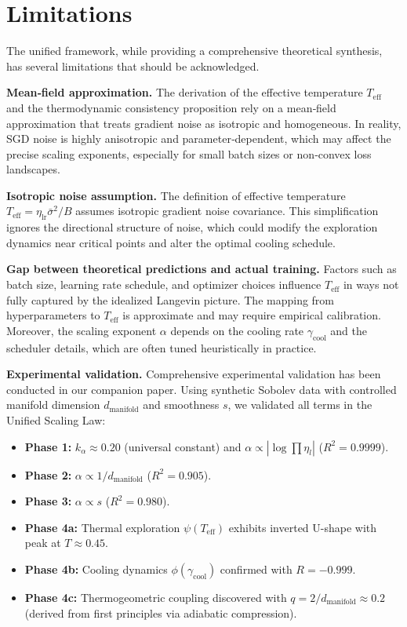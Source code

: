 \documentclass[11pt, a4paper]{article}
\theoremstyle{plain}
\begin{document}
\section{Limitations}
\label{sec:limitations}

The unified framework, while providing a comprehensive theoretical synthesis, has several limitations that should be acknowledged.

\textbf{Mean‑field approximation.} The derivation of the effective temperature $T_{\text{eff}}$ and the thermodynamic consistency proposition rely on a mean‑field approximation that treats gradient noise as isotropic and homogeneous. In reality, SGD noise is highly anisotropic and parameter‑dependent, which may affect the precise scaling exponents, especially for small batch sizes or non‑convex loss landscapes.

\textbf{Isotropic noise assumption.} The definition of effective temperature $T_{\text{eff}} = \eta_{\text{lr}}\bar{\sigma}^2/B$ assumes isotropic gradient noise covariance. This simplification ignores the directional structure of noise, which could modify the exploration dynamics near critical points and alter the optimal cooling schedule.

\textbf{Gap between theoretical predictions and actual training.} Factors such as batch size, learning rate schedule, and optimizer choices influence $T_{\text{eff}}$ in ways not fully captured by the idealized Langevin picture. The mapping from hyperparameters to $T_{\text{eff}}$ is approximate and may require empirical calibration. Moreover, the scaling exponent $\alpha$ depends on the cooling rate $\gamma_{\text{cool}}$ and the scheduler details, which are often tuned heuristically in practice.

\textbf{Experimental validation.} Comprehensive experimental validation has been conducted in our companion paper. Using synthetic Sobolev data with controlled manifold dimension $d_{\text{manifold}}$ and smoothness $s$, we validated all terms in the Unified Scaling Law:

\begin{itemize}
    \item \textbf{Phase 1:} $k_\alpha \approx 0.20$ (universal constant) and $\alpha \propto |\log\prod\eta_l|$ ($R^2 = 0.9999$).
    \item \textbf{Phase 2:} $\alpha \propto 1/d_{\text{manifold}}$ ($R^2 = 0.905$).
    \item \textbf{Phase 3:} $\alpha \propto s$ ($R^2 = 0.980$).
    \item \textbf{Phase 4a:} Thermal exploration $\psi(T_{\text{eff}})$ exhibits inverted U-shape with peak at $T \approx 0.45$.
    \item \textbf{Phase 4b:} Cooling dynamics $\phi(\gamma_{\text{cool}})$ confirmed with $R = -0.999$.
    \item \textbf{Phase 4c:} Thermogeometric coupling discovered with $q = 2/d_{\text{manifold}} \approx 0.2$ (derived from first principles via adiabatic compression).
\end{itemize}
\end{document}
